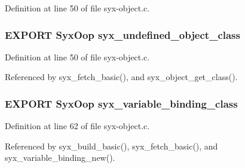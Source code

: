Definition at line 50 of file syx-object.c.\hypertarget{syx-object_8h_f534222f282de18e7b7b70237afb235a}{
\subsubsection{\setlength{\rightskip}{0pt plus 5cm}EXPORT {\bf SyxOop} {\bf syx\_\-undefined\_\-object\_\-class}}}
\label{syx-object_8h_f534222f282de18e7b7b70237afb235a}




Definition at line 50 of file syx-object.c.

Referenced by syx\_\-fetch\_\-basic(), and syx\_\-object\_\-get\_\-class().\hypertarget{syx-object_8h_4fb5b24130577a369d026a1849447dd1}{
\subsubsection{\setlength{\rightskip}{0pt plus 5cm}EXPORT {\bf SyxOop} {\bf syx\_\-variable\_\-binding\_\-class}}}
\label{syx-object_8h_4fb5b24130577a369d026a1849447dd1}




Definition at line 62 of file syx-object.c.

Referenced by syx\_\-build\_\-basic(), syx\_\-fetch\_\-basic(), and syx\_\-variable\_\-binding\_\-new().